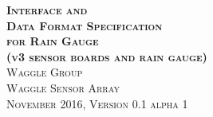 \documentclass{article}
\begin{document}
\begin{titlepage}
   \begin{center}
        \Huge\textbf{\textsc{Interface and \\ Data Format Specification \\ for Rain Gauge \\
        \Large\textsc(v3 sensor boards and rain gauge)}}\\[0.5cm]
        \Large\textsc{Waggle Group \\ Waggle Sensor Array}\\[1cm]
        \large\textsc{November 2016, }
        \large\textsc{Version 0.1 alpha 1}\\
   \end{center}
\end{titlepage}

\tableofcontents
\newpage




\end{document}
